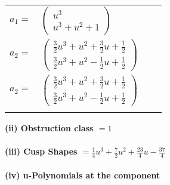 \documentclass[1p]{elsarticle_modified}
\theoremstyle{definition}
\begin{document}
\begin{tabular}{m{7pt} m{180pt} m{7pt} m{180pt} }
\flushright $a_{1}=$&$\begin{pmatrix}u^3\\u^3+u^2+1\end{pmatrix}$ \\
\flushright $a_{2}=$&$\begin{pmatrix}\frac{3}{2} u^3+u^2+\frac{3}{2} u+\frac{1}{2}\\\frac{3}{2} u^3+u^2-\frac{1}{2} u+\frac{1}{2}\end{pmatrix}$\\ \flushright $a_{2}=$&$\begin{pmatrix}\frac{3}{2} u^3+u^2+\frac{3}{2} u+\frac{1}{2}\\\frac{3}{2} u^3+u^2-\frac{1}{2} u+\frac{1}{2}\end{pmatrix}$\\&\end{tabular}
\flushleft \textbf{(ii) Obstruction class $= 1$}\\~\\
\flushleft \textbf{(iii) Cusp Shapes $= \frac{1}{4} u^3+\frac{7}{2} u^2+\frac{23}{4} u-\frac{37}{4}$}\\~\\
\newpage\renewcommand{\arraystretch}{1}
\flushleft \textbf{(iv) u-Polynomials at the component}\newline \\
\end{document}
